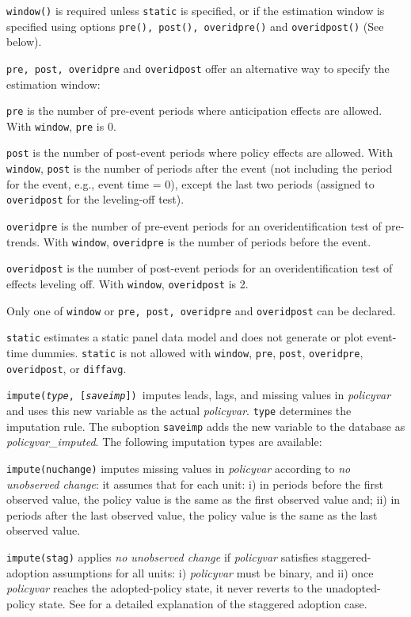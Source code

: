 \documentclass[12pt]{article}
\begin{document}
\hangpara
{\tt window()} is required unless {\tt static} is specified, or if the estimation window is specified using options {\tt pre(), post(), overidpre()} and {\tt overidpost()} (See below).

\hangpara
{\tt pre, post, overidpre} and {\tt overidpost} offer an alternative way to specify the estimation window:

\morehangpara
{\tt pre} is the number of pre-event periods where anticipation effects are allowed.
With {\tt window}, {\tt pre} is 0.

\morehangpara
{\tt post} is the number of post-event periods where policy effects are allowed.
With {\tt window}, {\tt post} is the number of periods after the event (not including the period for the event, e.g., event time = 0), except the last two periods (assigned to {\tt overidpost} for the leveling-off test).

\morehangpara
{\tt overidpre} is the number of pre-event periods for an overidentification test of pre-trends. With {\tt window}, {\tt overidpre} is the number of periods before the event.

\morehangpara
{\tt overidpost} is the number of post-event periods for an overidentification test of effects leveling off. With {\tt window}, {\tt overidpost} is 2.

\hangpara
Only one of {\tt window} or {\tt pre, post, overidpre} and {\tt overidpost} can be declared.

\hangpara
{\tt static} estimates a static panel data model and does not generate or plot event-time dummies.
{\tt static} is not allowed with {\tt window}, {\tt pre}, {\tt post}, {\tt overidpre}, {\tt overidpost}, or {\tt diffavg}.

\hangpara
{\tt impute({\it type}, [{\it saveimp}]) }imputes leads, lags, and missing values in {\it policyvar} and uses this new variable as the actual {\it policyvar}.
{\tt type} determines the imputation rule. The suboption {\tt saveimp} adds the new variable to the database as {\it policyvar\_imputed}.
The following imputation types are available:

\morehangpara
{\tt impute(nuchange)} imputes missing values in {\it policyvar} according to {\it no unobserved change}: it assumes that for each unit: i) in periods before the first observed value, the policy value is the same as the first observed value and; ii) in periods after the last observed value, the policy value is the same as the last observed value.

\morehangpara
{\tt impute(stag)} applies {\it no unobserved change} if {\it policyvar} satisfies staggered-adoption assumptions for all units: i) {\it policyvar} must be binary, and ii) once {\it policyvar} reaches the adopted-policy state, it never reverts to the unadopted-policy state.
See \citet{freyaldenhoven2021visualizationforth} for a detailed explanation of the staggered adoption case.
\end{document}
